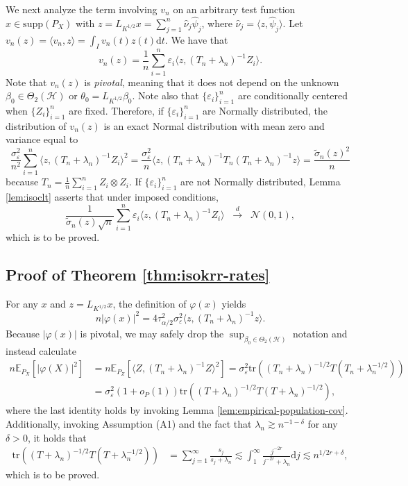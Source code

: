 \documentclass[11pt,a4paper]{article}
\renewcommand{\hat}{\widehat}
\renewcommand{\tilde}{\widetilde}
\newcommand{\tr}{\mathrm{tr}}
\theoremstyle{definition}
\theoremstyle{plain}
\theoremstyle{remark}
\newcommand{\supp}{\mathrm{supp}}
\newcommand{\ud}{\mathrm d}
\newcommand{\mH}{\mathcal H}
\begin{document}
We next analyze the term involving $v_n$ on an arbitrary test function $x\in\supp(P_X)$ with $z=L_{K^{1/2}}x=\sum_{j=1}^n\hat\nu_j\hat\psi_j$, where $\hat\nu_j=\langle z,\hat\psi_j\rangle$.
Let $v_n(z)=\langle v_n,z\rangle = \int_I v_n(t)z(t)\ud t$. We have that
$$
v_n(z) = \frac{1}{n}\sum_{i=1}^n \varepsilon_i \langle z, (T_n+\lambda_n)^{-1}Z_i\rangle.
$$
Note that $v_n(z)$ is \emph{pivotal}, meaning that it does not depend on the unknown $\beta_0\in\Theta_2(\mH)$ or $\theta_0=L_{K^{1/2}}\beta_0$.
Note also that $\{\varepsilon_i\}_{i=1}^n$ are conditionally centered when $\{Z_i\}_{i=1}^n$ are fixed. Therefore, if $\{\varepsilon_i\}_{i=1}^n$ are Normally distributed,
the distribution of $v_n(z)$ is an exact Normal distribution with mean zero and variance equal to
$$
\frac{{\sigma_\varepsilon^2}}{n^2}\sum_{i=1}^n \langle z,(T_n+\lambda_n)^{-1}Z_i\rangle^2 = \frac{{\sigma_\varepsilon^2}}{n}\langle z, (T_n+\lambda_n)^{-1}T_n(T_n+\lambda_n)^{-1}z\rangle = \frac{\tilde\sigma_n(z)^2}{n}
$$
because $T_n=\frac{1}{n}\sum_{i=1}^n Z_i\otimes Z_i$. If $\{\varepsilon_i\}_{i=1}^n$ are not Normally distributed, Lemma \ref{lem:isoclt} asserts that under imposed conditions,
$$
\frac{1}{\tilde\sigma_n(z)\sqrt{n}}\sum_{i=1}^n\varepsilon_i\langle z,(T_n+\lambda_n)^{-1}Z_i\rangle\;\;\overset{d}{\to}\;\; \mathcal N(0,1),
$$
which is to be proved.

\subsection{Proof of Theorem \ref{thm:isokrr-rates}}

For any $x$ and $z=L_{K^{1/2}}x$, the definition of $\varphi(x)$ yields
$$
n\big|\varphi(x)\big|^2 = 4 \tau^2_{\alpha/2}\sigma_\varepsilon^2\langle z, (T_n+\lambda_n)^{-1}z\rangle.
$$
Because $|\varphi(x)|$ is pivotal, we may safely drop the $\sup_{\beta_0\in\Theta_2(\mH)}$ notation and instead calculate
\begin{align*}
n\mathbb E_{P_X}\left[|\varphi(X)|^2\right] &= n\mathbb E_{P_Z}[\langle Z,(T_n+\lambda_n)^{-1}Z\rangle^2] = \sigma_\varepsilon^2\tr((T_n+\lambda_n)^{-1/2}T(T_n+\lambda_n^{-1/2}))\\
&= \sigma_\varepsilon^2(1+o_P(1))\tr((T+\lambda_n)^{-1/2}T(T+\lambda_n)^{-1/2}),
\end{align*}
where the last identity holds by invoking Lemma \ref{lem:empirical-population-cov}. Additionally, invoking Assumption (A1) and the fact that $\lambda_n\gtrsim n^{-1-\delta}$ for any $\delta>0$, it holds that
\begin{align*}
\tr((T+\lambda_n)^{-1/2}T(T+\lambda_n^{-1/2})) &= \sum_{j=1}^{\infty} \frac{s_j}{s_j+\lambda_n} \lesssim \int_1^{\infty}\frac{j^{-2r}}{j^{-2r}+\lambda_n}\ud j\lesssim n^{1/2r+\delta},
\end{align*}
which is to be proved.
\end{document}
